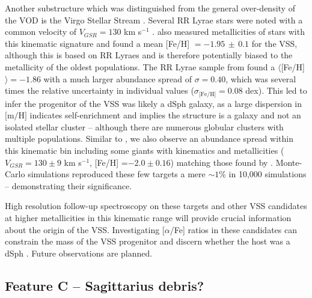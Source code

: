 \documentclass[preprint2]{aastex}
\begin{document}
	Another substructure which was distinguished from the general over-density of the VOD is the Virgo Stellar Stream \citep{Duffau;et-al_2006}. Several RR Lyrae stars were noted with a common velocity of $V_{GSR} = 130$ km s$^{-1}$ \citep{Newberg;et-al_2007, Prior;et-al_2009a}. \citet{Prior;et-al_2009a} also measured metallicities of stars with this kinematic signature and found a mean [Fe/H] $= -1.95\,\pm\,0.1$ for the VSS, although this is based on RR Lyraes and is therefore potentially biased to the metallicity of the oldest populations. The RR Lyrae sample from \citet{Duffau;et-al_2006} found a $\langle$[Fe/H]$\rangle = -1.86$ with a much larger abundance spread of $\sigma = 0.40$, which was several times the relative uncertainty in individual values ($\sigma_{\mbox{[Fe/H]}} = 0.08$ dex). This led \citet{Duffau;et-al_2006} to infer the progenitor of the VSS was likely a dSph galaxy, as a large dispersion in $\mbox{[m/H]}$ indicates self-enrichment and implies the structure is a galaxy and not an isolated stellar cluster \--- although there are numerous globular clusters with multiple populations. Similar to \citet{Duffau;et-al_2006}, we  also observe an abundance spread within this kinematic bin including some giants with kinematics and metallicities ($V_{GSR} = 130 \pm 9$ km s$^{-1}$, [Fe/H] =$ -2.0 \pm 0.16$) matching those found by \citet{Prior;et-al_2009a}. Monte-Carlo simulations reproduced these few targets a mere $\sim1$\% in 10,000 simulations \--- demonstrating their significance.

	High resolution follow-up spectroscopy on these targets and other VSS candidates at higher metallicities in this kinematic range will provide crucial information about the origin of the VSS.  Investigating [$\alpha$/Fe] ratios in these candidates can constrain the mass of the VSS progenitor and discern whether the host was a dSph \citep{Venn;et-al_2004, Casetti-Dinescu;et-al_2009}.  Future observations are planned.

	\subsection{Feature C \--- Sagittarius debris?}
	\label{sec:feature-c}
\end{document}
